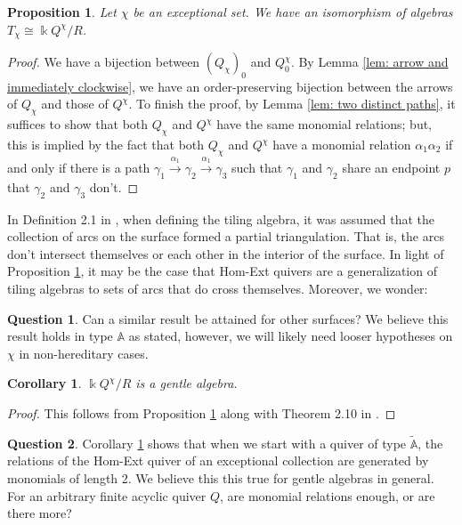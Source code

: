 \documentclass[12pt]{amsart}
\theoremstyle{plain}
\newtheorem{prop}[thm]{Proposition}
\newtheorem{cor}[thm]{Corollary}
\theoremstyle{definition}
\newtheorem{question}{Question}
\theoremstyle{remark}
\begin{document}
\begin{prop}\label{prop: H-E quiver is tiling algebra}
{\color{black} Let $\chi$ be an exceptional set}. We have an isomorphism of algebras $T_{\chi} \cong \Bbbk Q^{\chi}/R$.
\end{prop}
{\color{black}
\begin{proof}
We have a bijection between $(Q_{\chi})_0$ and $Q^{\chi}_0$. By Lemma \ref{lem: arrow and immediately clockwise}, we have an order-preserving bijection between the arrows of $Q_{\chi}$ and those of $Q^{\chi}$. To finish the proof, by Lemma \ref{lem: two distinct paths}, it suffices to show that both $Q_{\chi}$ and $Q^{\chi}$ have the same monomial relations; but, this is implied by the fact that both $Q_{\chi}$ and $Q^{\chi}$ have a monomial relation $\alpha_1\alpha_2$ if and only {\color{black} if there is a path $\gamma_1 \overset{\alpha_1}{\rightarrow} \gamma_2 \overset{\alpha_1}{\rightarrow} \gamma_3$  such that $\gamma_1$ and $\gamma_2$ share an endpoint $p$ that $\gamma_2$ and $\gamma_3$ don't.} 
\end{proof}
}
{\color{black} In Definition 2.1 in \cite{baur2021geometric}, when defining the tiling algebra, it was assumed that the collection of arcs on the surface formed a partial triangulation. That is, the arcs don't intersect themselves or each other in the interior of the surface. In light of Proposition \ref{prop: H-E quiver is tiling algebra}, it may be the case that Hom-Ext quivers are a generalization of tiling algebras to sets of arcs that do cross themselves. Moreover, we wonder:}

\begin{question}
Can a similar result be attained for other surfaces? We believe this result holds in type $\mathbb{A}$ as stated, however, we will likely need looser hypotheses on $\chi$ in non-hereditary cases.
\end{question}

\begin{cor}\label{cor: Hom-Ext quiver is gentle}
$\Bbbk Q^{\chi}/R$ is a gentle algebra.
\end{cor}

\begin{proof}
This follows from Proposition \ref{prop: H-E quiver is tiling algebra} along with Theorem 2.10 in \cite{baur2021geometric}.
\end{proof}

\begin{question}
Corollary \ref{cor: Hom-Ext quiver is gentle} shows that when we start with a quiver of type $\tilde{\mathbb{A}}$, the relations of the Hom-Ext quiver of an exceptional collection are generated by monomials of length 2. We believe this this true for gentle algebras in general. For an arbitrary finite acyclic quiver $Q$, are  monomial relations enough, or are there more? 
\end{question}
\end{document}
